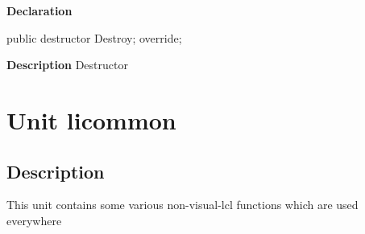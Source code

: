 \documentclass{report}
\newif\ifpdf
\begin{document}
\label{lentries.TListEntry-Destroy}
\begin{list}{}{
\setlength{\itemindent}{0cm}
\setlength{\listparindent}{0cm}
\setlength{\leftmargin}{\evensidemargin}
\addtolength{\leftmargin}{\tmplength}
\settowidth{\labelsep}{X}
\addtolength{\leftmargin}{\labelsep}
\setlength{\labelwidth}{\tmplength}
}
\item[\textbf{Declaration}\hfill]
\ifpdf
\begin{flushleft}
\fi
\begin{ttfamily}
public destructor Destroy; override;\end{ttfamily}

\ifpdf
\end{flushleft}
\fi

\par
\item[\textbf{Description}]
Destructor

\end{list}
\chapter{Unit licommon}
\label{licommon}
\section{Description}
This unit contains some various non{-}visual{-}lcl functions which are used everywhere
\end{document}

